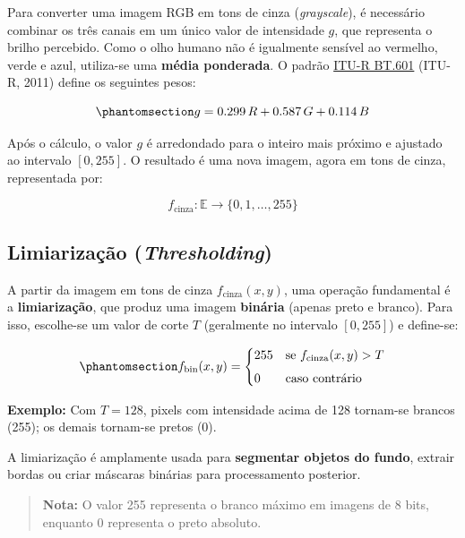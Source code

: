 \documentclass[
  portuguese,
  letterpaper,
  openany,
  oneside,
  12pt,
  a4paper]{book}
\begin{document}
Para converter uma imagem RGB em tons de cinza (\emph{grayscale}), é
necessário combinar os três canais em um único valor de intensidade
\(g\), que representa o brilho percebido. Como o olho humano não é
igualmente sensível ao vermelho, verde e azul, utiliza-se uma
\textbf{média ponderada}. O padrão
\href{https://www.itu.int/rec/R-REC-BT.601/}{ITU-R BT.601} (ITU-R, 2011)
define os seguintes pesos:

\begin{equation}\phantomsection\label{eq-01-cinza}{
g = 0.299\,R + 0.587\,G + 0.114\,B 
}\end{equation}

Após o cálculo, o valor \(g\) é arredondado para o inteiro mais próximo
e ajustado ao intervalo \([0, 255]\). O resultado é uma nova imagem,
agora em tons de cinza, representada por:

\[
f_{\text{cinza}}: \mathbb{E} \to \{0,1,\dots,255\}
\]

\subsection*{\texorpdfstring{Limiarização
(\emph{Thresholding})}{Limiarização (Thresholding)}}\label{limiarizauxe7uxe3o-thresholding}

A partir da imagem em tons de cinza \(f_{\text{cinza}}(x,y)\), uma
operação fundamental é a \textbf{limiarização}, que produz uma imagem
\textbf{binária} (apenas preto e branco). Para isso, escolhe-se um valor
de corte \(T\) (geralmente no intervalo \([0,255]\)) e define-se:

\begin{equation}\phantomsection\label{eq-01-limiar}{
f_{\text{bin}}(x,y) = 
\begin{cases} 
255 & \text{se } f_{\text{cinza}}(x,y) > T \\[4pt]
0 & \text{caso contrário}
\end{cases}
}\end{equation}

\textbf{Exemplo:} Com \(T = 128\), pixels com intensidade acima de 128
tornam-se brancos (255); os demais tornam-se pretos (0).

A limiarização é amplamente usada para \textbf{segmentar objetos do
fundo}, extrair bordas ou criar máscaras binárias para processamento
posterior.

\begin{quote}
\textbf{Nota:} O valor 255 representa o branco máximo em imagens de 8
bits, enquanto 0 representa o preto absoluto.
\end{quote}
\end{document}
